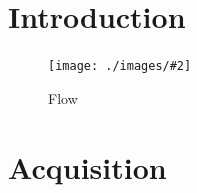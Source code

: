 \documentclass[12pt,a4paper,pdftex,twoside,liststotoc,listsleft]{scrartcl}
\title{\mytitle}
\date{\today}
\author{\myauthor}
\newcommand{\fig}[4]
{
 \begin{figure}[h]
  \centering
  \texttt{[image: ./images/\#2]}
  \caption{#3}
  \label{#4}
 \end{figure}
}
\begin{document}
\maketitle

\begin{abstract}
The Abstract.
\end{abstract}

\newpage
\tableofcontents

\section{Introduction}
\fig{1.0}{corpflow.pdf}{Flow}{Details}
\section{Acquisition}

\appendix
\clearpage


\end{document}
